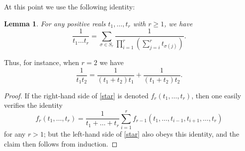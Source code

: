 \documentclass{bmcart}
\theoremstyle{plain}
\newtheorem{lemma}[theorem]{Lemma}
\theoremstyle{definition}
\begin{document}
At this point we use the following identity:

\begin{lemma}  For any positive reals $t_1,\dots,t_r$ with $r \geq 1$, we have
\begin{equation}\label{star}
 \frac{1}{t_1 \dots t_r} = \sum_{\sigma \in S_r} \frac{1}{\prod_{i=1}^r (\sum_{j=i}^r t_{\sigma(j)})}.
\end{equation}
\end{lemma}
Thus, for instance, when $r=2$ we have
$$ \frac{1}{t_1 t_2} = \frac{1}{(t_1+t_2) t_1} + \frac{1}{(t_1+t_2)t_2}.$$


\begin{proof}  If the right-hand side of \eqref{star} is denoted $f_r( t_1,\dots,t_r )$, then one easily verifies the identity
$$ f_r(t_1,\dots,t_r) = \frac{1}{t_1+\dots+t_r} \sum_{i=1}^r f_{r-1}(t_1,\dots,t_{i-1},t_{i+1},\dots,t_r)$$
for any $r > 1$; but the left-hand side of \eqref{star} also obeys this identity, and the claim then follows from induction.
\end{proof}
\end{document}
